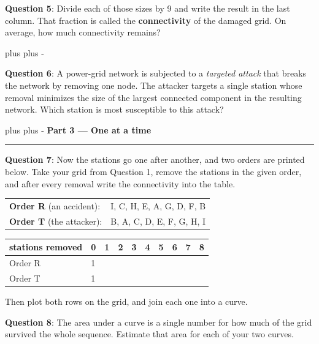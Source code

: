 \documentclass[a4paper, 14pt]{extarticle}
\newcommand{\needroom}[1]{%
  \par
  \begingroup
    \setlength{\dimen0}{#1}%
    \vskip 0pt plus \dimen0
    \penalty -100%
    \vskip 0pt plus -\dimen0
  \endgroup}
\newcommand{\parthead}[2]{%
  \needroom{6\baselineskip}%
  \partheadhere{#1}{#2}}
\newcommand{\partheadhere}[2]{%
  \vspace{0.5em}
  {\large\bfseries Part #1 --- #2}\par
  \vspace{-0.4em}\rule{\textwidth}{0.8pt}\par
  \vspace{0.1em}}
\begin{document}
{\bf Question 5}:
Divide each of those sizes by 9 and write the result in the last column.
That fraction is called the \textbf{connectivity} of the damaged grid.
On average, how much connectivity remains?

\needroom{5\baselineskip}

{\bf Question 6}:
A power-grid network is subjected to a \textit{targeted attack} that breaks the network by removing one node.
The attacker targets a single station whose removal minimizes the size of the largest connected component in the resulting network.
Which station is most susceptible to this attack?

\parthead{3}{One at a time}

\begin{minipage}{\textwidth}
{\bf Question 7}:
Now the stations go one after another, and two orders are printed below.
Take your grid from Question 1, remove the stations in the given order, and after every removal write the connectivity into the table.

\vspace{0.2em}
\begin{tabular}{@{}ll@{}}
\textbf{Order R} (an accident): & I, C, H, E, A, G, D, F, B \\[0.2em]
\textbf{Order T} (the attacker): & B, A, C, D, E, F, G, H, I \\
\end{tabular}
\vspace{0.3em}

\begin{center}
\small
\begin{tabular}{|l|C{1.0cm}|C{1.0cm}|C{1.0cm}|C{1.0cm}|C{1.0cm}|C{1.0cm}|C{1.0cm}|C{1.0cm}|C{1.0cm}|}
\hline
stations removed & 0 & 1 & 2 & 3 & 4 & 5 & 6 & 7 & 8 \\ \hline
Order R & 1 & & & & & & & & \\[0.3cm] \hline
Order T & 1 & & & & & & & & \\[0.3cm] \hline
\end{tabular}
\end{center}

Then plot both rows on the grid, and join each one into a curve.

\begin{center}
  \profilegrid
\end{center}
\end{minipage}

{\bf Question 8}:
The area under a curve is a single number for how much of the grid survived the whole sequence.
Estimate that area for each of your two curves.
\end{document}
